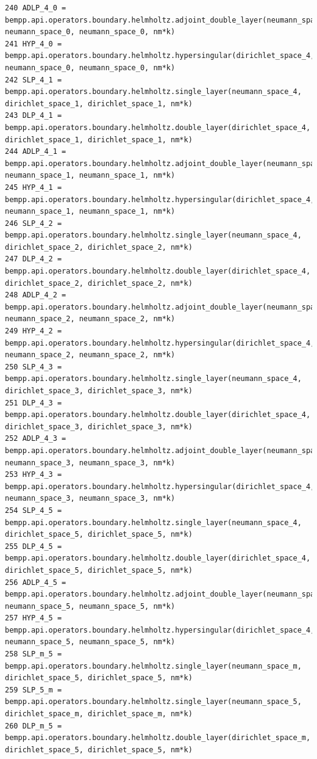 \documentclass[12pt,letterpaper]{article}
\numberwithin{equation}{section}
\begin{document}
\begin{lstlisting}
240 ADLP_4_0 = bempp.api.operators.boundary.helmholtz.adjoint_double_layer(neumann_space_4, neumann_space_0, neumann_space_0, nm*k)
241 HYP_4_0 = bempp.api.operators.boundary.helmholtz.hypersingular(dirichlet_space_4, neumann_space_0, neumann_space_0, nm*k)
242 SLP_4_1 = bempp.api.operators.boundary.helmholtz.single_layer(neumann_space_4, dirichlet_space_1, dirichlet_space_1, nm*k)
243 DLP_4_1 = bempp.api.operators.boundary.helmholtz.double_layer(dirichlet_space_4, dirichlet_space_1, dirichlet_space_1, nm*k)
244 ADLP_4_1 = bempp.api.operators.boundary.helmholtz.adjoint_double_layer(neumann_space_4, neumann_space_1, neumann_space_1, nm*k)
245 HYP_4_1 = bempp.api.operators.boundary.helmholtz.hypersingular(dirichlet_space_4, neumann_space_1, neumann_space_1, nm*k)
246 SLP_4_2 = bempp.api.operators.boundary.helmholtz.single_layer(neumann_space_4, dirichlet_space_2, dirichlet_space_2, nm*k)
247 DLP_4_2 = bempp.api.operators.boundary.helmholtz.double_layer(dirichlet_space_4, dirichlet_space_2, dirichlet_space_2, nm*k)
248 ADLP_4_2 = bempp.api.operators.boundary.helmholtz.adjoint_double_layer(neumann_space_4, neumann_space_2, neumann_space_2, nm*k)
249 HYP_4_2 = bempp.api.operators.boundary.helmholtz.hypersingular(dirichlet_space_4, neumann_space_2, neumann_space_2, nm*k)
250 SLP_4_3 = bempp.api.operators.boundary.helmholtz.single_layer(neumann_space_4, dirichlet_space_3, dirichlet_space_3, nm*k)
251 DLP_4_3 = bempp.api.operators.boundary.helmholtz.double_layer(dirichlet_space_4, dirichlet_space_3, dirichlet_space_3, nm*k)
252 ADLP_4_3 = bempp.api.operators.boundary.helmholtz.adjoint_double_layer(neumann_space_4, neumann_space_3, neumann_space_3, nm*k)
253 HYP_4_3 = bempp.api.operators.boundary.helmholtz.hypersingular(dirichlet_space_4, neumann_space_3, neumann_space_3, nm*k)
254 SLP_4_5 = bempp.api.operators.boundary.helmholtz.single_layer(neumann_space_4, dirichlet_space_5, dirichlet_space_5, nm*k)
255 DLP_4_5 = bempp.api.operators.boundary.helmholtz.double_layer(dirichlet_space_4, dirichlet_space_5, dirichlet_space_5, nm*k)
256 ADLP_4_5 = bempp.api.operators.boundary.helmholtz.adjoint_double_layer(neumann_space_4, neumann_space_5, neumann_space_5, nm*k)
257 HYP_4_5 = bempp.api.operators.boundary.helmholtz.hypersingular(dirichlet_space_4, neumann_space_5, neumann_space_5, nm*k)
258 SLP_m_5 = bempp.api.operators.boundary.helmholtz.single_layer(neumann_space_m, dirichlet_space_5, dirichlet_space_5, nm*k)
259 SLP_5_m = bempp.api.operators.boundary.helmholtz.single_layer(neumann_space_5, dirichlet_space_m, dirichlet_space_m, nm*k)
260 DLP_m_5 = bempp.api.operators.boundary.helmholtz.double_layer(dirichlet_space_m, dirichlet_space_5, dirichlet_space_5, nm*k)

\end{lstlisting}
\end{document}

